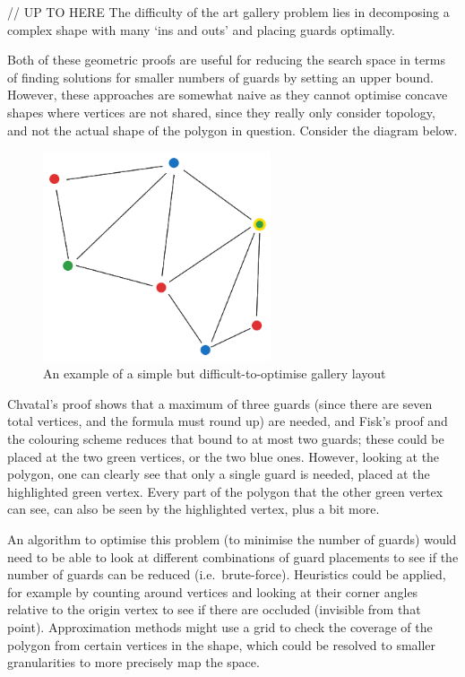 \documentclass[
]{article}
\begin{document}
// UP TO HERE The difficulty of the art gallery problem lies in
decomposing a complex shape with many `ins and outs' and placing guards
optimally.

Both of these geometric proofs are useful for reducing the search space
in terms of finding solutions for smaller numbers of guards by setting
an upper bound. However, these approaches are somewhat naive as they
cannot optimise concave shapes where vertices are not shared, since they
really only consider topology, and not the actual shape of the polygon
in question. Consider the diagram below.

\begin{figure}
\centering
\includegraphics[width=0.6\textwidth,height=\textheight]{diagrams/Complicated Gallery.png}
\caption{An example of a simple but difficult-to-optimise gallery
layout}
\end{figure}

Chvatal's proof shows that a maximum of three guards (since there are
seven total vertices, and the formula must round up) are needed, and
Fisk's proof and the colouring scheme reduces that bound to at most two
guards; these could be placed at the two green vertices, or the two blue
ones. However, looking at the polygon, one can clearly see that only a
single guard is needed, placed at the highlighted green vertex. Every
part of the polygon that the other green vertex can see, can also be
seen by the highlighted vertex, plus a bit more.

An algorithm to optimise this problem (to minimise the number of guards)
would need to be able to look at different combinations of guard
placements to see if the number of guards can be reduced
(i.e.~brute-force). Heuristics could be applied, for example by counting
around vertices and looking at their corner angles relative to the
origin vertex to see if there are occluded (invisible from that point).
Approximation methods might use a grid to check the coverage of the
polygon from certain vertices in the shape, which could be resolved to
smaller granularities to more precisely map the space.
\end{document}

